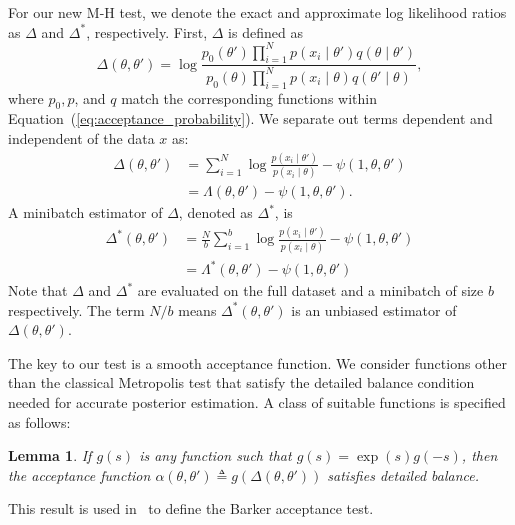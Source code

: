 \documentclass[twoside]{article} \usepackage{aistats2017}
\newtheorem{lemma}{Lemma}
\begin{document}
For our new M-H test, we denote the exact and approximate log likelihood ratios
as $\Delta$ and $\Delta^*$, respectively. First, $\Delta$ is defined as
\begin{equation}\label{eq:delta1}
    \Delta(\theta,\theta')  =
    \log \frac{p_0(\theta')\prod_{i=1}^N p(x_i \mid \theta')q(\theta \mid
    \theta')}{p_0(\theta)\prod_{i=1}^N p(x_i \mid \theta)q(\theta' \mid\theta)},
\end{equation}
where $p_0, p$, and $q$ match the corresponding functions within
Equation~(\ref{eq:acceptance_probability}). We separate out terms dependent and
independent of the data $x$ as:
\begin{equation}\label{eq:delta2}
\begin{split}
    \Delta(\theta,\theta') &= \sum_{i=1}^N\log\frac{p(x_i\mid\theta')}{p(x_i\mid\theta)} - \psi(1,\theta,\theta') \\
    & = \Lambda(\theta,\theta') - \psi(1,\theta,\theta').
\end{split}
\end{equation}
A minibatch estimator of $\Delta$, denoted as $\Delta^*$, is
\begin{equation}\label{eq:delta3}
\begin{split}
    \Delta^*(\theta,\theta') &=
\frac{N}{b}\sum_{i=1}^b\log\frac{p(x_i\mid\theta')}{p(x_i\mid\theta)} - \psi(1,\theta,\theta')\\
&=\Lambda^*(\theta,\theta') - \psi(1,\theta,\theta')
\end{split}
\end{equation}
Note that $\Delta$ and $\Delta^*$ are evaluated on the full dataset and a
minibatch of size $b$ respectively. The term $N/b$ means
$\Delta^*(\theta,\theta')$ is an unbiased estimator of $\Delta(\theta,\theta')$.

The key to our test is a smooth acceptance function.  We consider functions
other than the classical Metropolis test that satisfy the detailed balance
condition needed for accurate posterior estimation. A class of suitable
functions is specified as follows:

\begin{lemma}\label{lem:detailed_balance}
    If $g(s)$ is any function such that $g(s) = \exp(s) g(-s)$, then the
    acceptance function $\alpha(\theta,\theta') \triangleq
    g(\Delta(\theta,\theta'))$ satisfies detailed balance.
\end{lemma}

This result is used in~\citet{Barker65} to define the Barker acceptance test.
\end{document}
